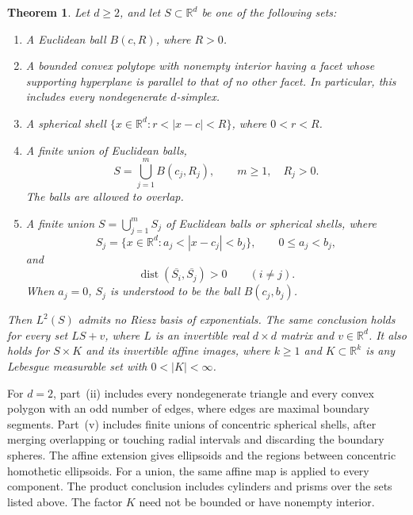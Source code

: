 \documentclass[12pt,reqno,tbtags]{amsart}
\newtheorem{theorem}{Theorem}[section]
\def\R{\mathbb{R}}
\newcommand\1{\mathbbm{1}}
\begin{document}
\begin{theorem}\label{thm:main}
Let $d\ge2$, and let $S\subset\R^d$ be one of the following sets:
\begin{enumerate}
    \item[(i)] A Euclidean ball $B(c,R)$, where $R>0$.

    \item[(ii)] A bounded convex polytope with nonempty interior having a facet
    whose supporting hyperplane is parallel to that of no other facet.
    In particular, this includes every nondegenerate $d$-simplex.

    \item[(iii)] A spherical shell $\{x\in\R^d:r<|x-c|<R\}$,
    where $0<r<R$.

    \item[(iv)] A finite union of Euclidean balls,
    \begin{equation*}
        S=\bigcup_{j=1}^{m}B(c_j,R_j),
        \qquad m\ge1,\quad R_j>0.
    \end{equation*}
    The balls are allowed to overlap.

    \item[(v)] A finite union $S=\bigcup_{j=1}^{m}S_j$ of Euclidean balls or
    spherical shells, where
    \begin{equation*}
        S_j=\{x\in\R^d:a_j<|x-c_j|<b_j\},
        \qquad 0\le a_j<b_j,
    \end{equation*}
    and
    \begin{equation*}
        \operatorname{dist}(\overline{S_i},\overline{S_j})>0
        \qquad (i\ne j).
    \end{equation*}
    When $a_j=0$, $S_j$ is understood to be the ball $B(c_j,b_j)$.
\end{enumerate}
Then $L^2(S)$ admits no Riesz basis of exponentials. The same conclusion holds
for every set $LS+v$, where $L$ is an invertible real $d\times d$ matrix and
$v\in\R^d$. It also holds for $S\times K$ and its invertible affine images,
where $k\ge1$ and $K\subset\R^k$ is any Lebesgue measurable set with
$0<|K|<\infty$.
\end{theorem}

For $d=2$, part~(ii) includes every nondegenerate triangle and every convex
polygon with an odd number of edges, where edges are maximal boundary segments.
Part~(v) includes finite unions of concentric spherical shells, after merging
overlapping or touching radial intervals and discarding the boundary spheres.
The affine extension gives ellipsoids and the regions between concentric
homothetic ellipsoids. For a union, the same affine map is applied to every component.
The product conclusion includes cylinders and prisms over the sets listed above.
The factor $K$ need not be bounded or have nonempty interior.
\end{document}
